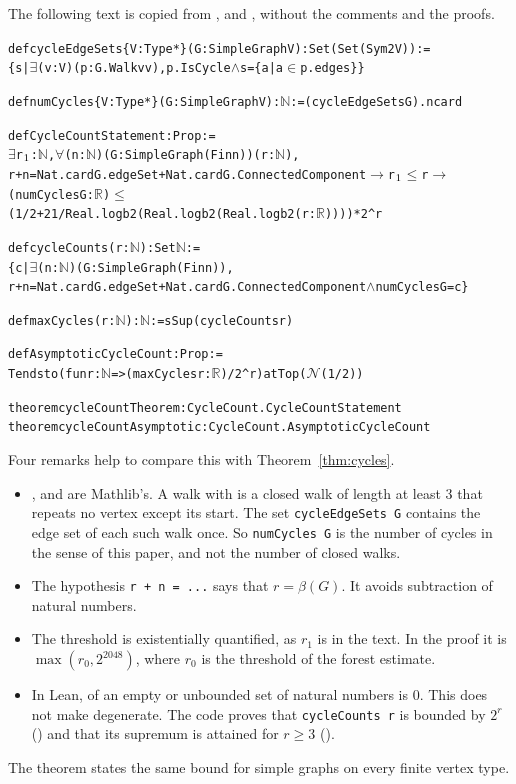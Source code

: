 \documentclass[11pt]{article}
\theoremstyle{definition}
\theoremstyle{remark}
\numberwithin{equation}{section}
\begin{document}
The following text is copied from ,
 and , without the comments and the proofs.

{\small
\begin{alltt}
def cycleEdgeSets \{V : Type*\} (G : SimpleGraph V) : Set (Set (Sym2 V)) :=
  \{s | \(\exists\) (v : V) (p : G.Walk v v), p.IsCycle \(\land\) s = \{a | a \(\in\) p.edges\}\}

def numCycles \{V : Type*\} (G : SimpleGraph V) : \(\mathbb{N}\) := (cycleEdgeSets G).ncard

def CycleCountStatement : Prop :=
  \(\exists\) r\(\sb{1}\) : \(\mathbb{N}\), \(\forall\) (n : \(\mathbb{N}\)) (G : SimpleGraph (Fin n)) (r : \(\mathbb{N}\)),
    r + n = Nat.card G.edgeSet + Nat.card G.ConnectedComponent \(\to\) r\(\sb{1}\) \(\le\) r \(\to\)
    (numCycles G : \(\mathbb{R}\)) \(\le\)
      (1 / 2 + 21 / Real.logb 2 (Real.logb 2 (Real.logb 2 (r : \(\mathbb{R}\))))) * 2 ^ r

def cycleCounts (r : \(\mathbb{N}\)) : Set \(\mathbb{N}\) :=
  \{c | \(\exists\) (n : \(\mathbb{N}\)) (G : SimpleGraph (Fin n)),
    r + n = Nat.card G.edgeSet + Nat.card G.ConnectedComponent \(\land\) numCycles G = c\}

def maxCycles (r : \(\mathbb{N}\)) : \(\mathbb{N}\) := sSup (cycleCounts r)

def AsymptoticCycleCount : Prop :=
  Tendsto (fun r : \(\mathbb{N}\) => (maxCycles r : \(\mathbb{R}\)) / 2 ^ r) atTop (\(\mathcal{N}\) (1 / 2))

theorem cycleCountTheorem : CycleCount.CycleCountStatement
theorem cycleCountAsymptotic : CycleCount.AsymptoticCycleCount
\end{alltt}}

Four remarks help to compare this with Theorem~\ref{thm:cycles}.
\begin{itemize}
\item {},  and  are Mathlib's. A walk with 
is a closed walk of length at least $3$ that repeats no vertex except its start. The set
\texttt{cycleEdgeSets G} contains the edge set of each such walk once. So \texttt{numCycles G} is the
number of cycles in the sense of this paper, and not the number of closed walks.
\item The hypothesis \texttt{r + n = ...} says that $r=\beta(G)$. It avoids subtraction of natural
numbers.
\item The threshold is existentially quantified, as $r_1$ is in the text. In the proof it is
$\max(r_0,2^{2048})$, where $r_0$ is the threshold of the forest estimate.
\item In Lean,  of an empty or unbounded set of natural numbers is $0$. This does not
make  degenerate. The code proves that \texttt{cycleCounts r} is bounded by $2^{r}$
() and that its supremum is attained for $r\ge3$ ().
\end{itemize}
The theorem  states the same bound for simple graphs on every
finite vertex type.
\end{document}
